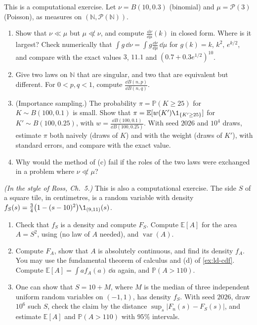 \begin{exercise}\label{ex:ld-rn-finite}
\medium This is a computational exercise. Let $\nu=B(10,0.3)$ (binomial) and $\mu=\mathcal P(3)$
(Poisson), as measures on $(\mathbb N,\mathcal P(\mathbb N))$.
\begin{enumerate}[label=(\alph*)]
  \item Show that $\nu\ll\mu$ but $\mu\not\ll\nu$, and compute $\frac{\dd\nu}{\dd\mu}(k)$ in closed form.
    Where is it largest? Check numerically that $\int g\,\dd\nu=\int g\frac{\dd\nu}{\dd\mu}\,\dd\mu$ for
    $g(k)=k$, $k^2$, $e^{k/2}$, and compare with the exact values $3$, $11.1$ and
    $(0.7+0.3e^{1/2})^{10}$.
  \item Give two laws on $\mathbb N$ that are singular, and two that are equivalent but different.
    For $0<p,q<1$, compute $\frac{\dd B(n,p)}{\dd B(n,q)}$.
  \item (Importance sampling.) The probability $\pi=\mathbb P(K\ge25)$ for $K\sim B(100,0.1)$ is
    small. Show that $\pi=\mathbb E[w(K')\1_{\{K'\ge25\}}]$ for $K'\sim B(100,0.25)$, with
    $w=\frac{\dd B(100,0.1)}{\dd B(100,0.25)}$. With seed $2026$ and $10^4$ draws, estimate $\pi$ both
    naively (draws of $K$) and with the weight (draws of $K'$), with standard errors, and compare
    with the exact value.
  \item Why would the method of (c) fail if the roles of the two laws were exchanged in a problem
    where $\nu\not\ll\mu$?
\end{enumerate}
\end{exercise}

\begin{exercise}\label{ex:ld-tile}
\easy \emph{(In the style of Ross, Ch.~5.)} This is also a computational exercise. The side $S$ of a
square tile, in centimetres, is a random variable with density
$f_S(s)=\frac34\big(1-(s-10)^2\big)\1_{(9,11)}(s)$.
\begin{enumerate}[label=(\alph*)]
  \item Check that $f_S$ is a density and compute $F_S$. Compute $\mathbb E[A]$ for the area $A=S^2$,
    using  (no law of $A$ needed), and $\operatorname{var}(A)$.
  \item Compute $F_A$, show that $A$ is absolutely continuous, and find its density $f_A$. You may use
    the fundamental theorem of calculus and (d) of \cref{ex:ld-cdf}. Compute $\mathbb E[A]=\int af_A(a)\,\dd a$ again, and
    $\mathbb P(A>110)$.
  \item One can show that $S=10+M$, where $M$ is the median of three independent uniform random
    variables on $(-1,1)$, has density $f_S$. With seed $2026$, draw $10^6$ such $S$, check the
    claim by the distance $\sup_s|F_n(s)-F_S(s)|$, and estimate $\mathbb E[A]$ and $\mathbb P(A>110)$
    with $95\%$ intervals.
\end{enumerate}
\end{exercise}

